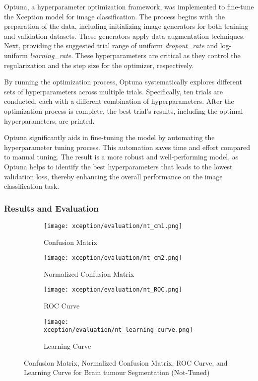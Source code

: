 Optuna, a hyperparameter optimization framework, was implemented to fine-tune the Xception model for image classification. The process begins with the preparation of the data, including initializing image generators for both training and validation datasets. These generators apply data augmentation techniques. Next, providing the suggested trial range of uniform \textit{dropout\_rate} and log-uniform \textit{learning\_rate}. These hyperparameters are critical as they control the regularization and the step size for the optimizer, respectively.

By running the optimization process, Optuna systematically explores different sets of hyperparameters across multiple trials. Specifically, ten trials are conducted, each with a different combination of hyperparameters. After the optimization process is complete, the best trial's results, including the optimal hyperparameters, are printed. 

Optuna significantly aids in fine-tuning the model by automating the hyperparameter tuning process. This automation saves time and effort compared to manual tuning. The result is a more robust and well-performing model, as Optuna helps to identify the best hyperparameters that leads to the lowest validation loss, thereby enhancing the overall performance on the image classification task.

\subsubsection{Results and Evaluation}


\begin{figure}[H]
    \centering
    \begin{subfigure}[b]{0.2\textwidth}
      \centering
      \texttt{[image: xception/evaluation/nt\_cm1.png]}
      \caption{Confusion Matrix}
      \label{fig:xception_nt_cm1}
    \end{subfigure}
    \hfill
    \begin{subfigure}[b]{0.2\textwidth}
      \centering
      \texttt{[image: xception/evaluation/nt\_cm2.png]}
      \caption{Normalized Confusion Matrix}
      \label{fig:xception_nt_cm2}
    \end{subfigure}
    \hfill
    \begin{subfigure}[b]{0.25\textwidth}
      \centering
      \texttt{[image: xception/evaluation/nt\_ROC.png]}
      \caption{ROC Curve}
      \label{fig:xception_nt_roc}
    \end{subfigure}
    \hfill
    \begin{subfigure}[b]{0.25\textwidth}
      \centering
      \texttt{[image: xception/evaluation/nt\_learning\_curve.png]}
      \caption{Learning Curve}
      \label{fig:xception_nt_learning_curve}
    \end{subfigure}
    \caption{Confusion Matrix, Normalized Confusion Matrix, ROC Curve, and Learning Curve for Brain tumour Segmentation (Not-Tuned)}
    \label{fig:xception_nt_evaluation}
  \end{figure}
  

